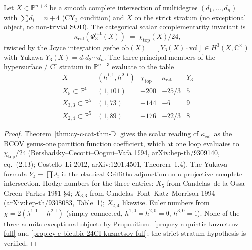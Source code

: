 \begin{theorem}
\label{thm:cy-c-ci-cy3-stratum-universal-kappa-cat}
Let $X \subset \mathbb P^{n+3}$ be a smooth complete intersection of
multidegree $(d_1, \ldots, d_n)$ with $\sum d_i = n+4$ (CY$_3$
condition) and $X$ on the strict stratum (no exceptional object, no
non-trivial SOD). The categorical scalar complementarity invariant is
\[
 \kappa_{\mathrm{cat}}(\Phi_3^{\mathrm{cat}}(X))
 \;=\; \chi_{\mathrm{top}}(X)/24,
\]
twisted by the Joyce integration gerbe
$\mathrm{ob}(X) = [Y_3(X) \cdot \mathrm{vol}] \in H^3(X, \mathbb C^\times)$
with Yukawa $Y_3(X) = d_1 d_2 \cdots d_n$. The three principal members
of the hypersurface / CI stratum in $\mathbb P^{n+3}$ evaluate to the
table
\[
 \begin{array}{c|c|c|c|c}
 X & (h^{1,1}, h^{2,1}) & \chi_{\mathrm{top}} & \kappa_{\mathrm{cat}} & Y_3 \\ \hline
 X_5 \subset \mathbb P^4 & (1, 101) & -200 & -25/3 & 5 \\
 X_{3,3} \subset \mathbb P^5 & (1, 73) & -144 & -6 & 9 \\
 X_{2,4} \subset \mathbb P^5 & (1, 89) & -176 & -22/3 & 8
 \end{array}
\]
\end{theorem}

\begin{proof}
Theorem~\ref{thm:cy-c-cat-thm-D} gives the scalar reading of
$\kappa_{\mathrm{cat}}$ as the BCOV genus-one partition function
coefficient, which at one loop evaluates to $\chi_{\mathrm{top}}/24$
(Bershadsky--Cecotti--Ooguri--Vafa 1994, arXiv:hep-th/9309140,
eq.~(2.13); Costello--Li 2012, arXiv:1201.4501, Theorem~1.4). The
Yukawa formula $Y_3 = \prod d_i$ is the classical Griffiths adjunction
on a projective complete intersection. Hodge numbers for the three
entries: $X_5$ from Candelas--de la Ossa--Green--Parkes 1991 \S 4;
$X_{3,3}$ from Candelas--Font--Katz--Morrison 1994
(arXiv:hep-th/9308083, Table~1); $X_{2,4}$ likewise. Euler numbers
from $\chi = 2(h^{1,1} - h^{2,1})$ (simply connected, $h^{1,0} = h^{2,0} = 0$,
$h^{3,0} = 1$). None of the three admits exceptional objects by
Propositions~\ref{prop:cy-c-quintic-kuznetsov-full} and
\ref{prop:cy-c-bicubic-24CI-kuznetsov-full}; the strict-stratum
hypothesis is verified.
\end{proof}


